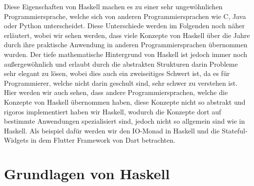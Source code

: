 \documentclass{hhuarticle}
\theoremstyle{definition}
\theoremstyle{theorem}
\begin{document}
  Diese Eigenschaften von Haskell machen es zu einer sehr ungewöhnlichen
  Programmiersprache, welche sich von anderen Programmiersprachen
  wie C, Java oder Python unterscheidet. Diese Unterschiede werden
  im Folgenden noch näher erläutert, wobei wir sehen werden,
  dass viele Konzepte von Haskell über die Jahre durch ihre praktische
  Anwendung in anderen Programmiersprachen übernommen wurden.
  Der tiefe mathematische Hintergrund von Haskell ist jedoch
  immer noch außergewöhnlich und erlaubt durch die abstrakten
  Strukturen darin Probleme sehr elegant zu lösen, wobei dies auch
  ein zweiseitiges Schwert ist, da es für Programmierer, welche
  nicht darin geschult sind, sehr schwer zu verstehen ist. Hier werden
  wir auch sehen, dass andere Programmiersprachen, welche die
  Konzepte von Haskell übernommen haben, diese Konzepte nicht
  so abstrakt und rigoros implementiert haben wir Haskell, wodurch
  die Konzepte dort auf bestimmte Anwendungen spezialisiert sind,
  jedoch nicht so allgemein sind wie in Haskell. Als beispiel dafür
  werden wir den IO-Monad in Haskell und die Stateful-Widgets in
  dem Flutter Framework von Dart betrachten.






  \section{Grundlagen von Haskell}
  
\end{document}
